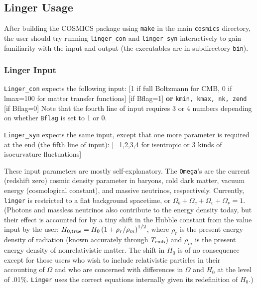 \subsection{Linger Usage}
\label{linger:usage}

After building the COSMICS package using {\tt make} in the main {\tt cosmics}
directory, the user should try running {\tt linger\_con} and {\tt linger\_syn}
interactively to gain familiarity with the input and output (the executables
are in subdirectory {\tt bin}).

\subsubsection{Linger Input}

{\tt Linger\_con} expects the following input:\hfil\newline
\indent{}\hfil\newline
\indent{}\hfil\newline
\indent{} [1 if full Boltzmann for CMB, 0 if lmax=100 for
    matter transfer functions]\hfil\newline
\indent{} [if Bflag=1] {\bf or}
               {\tt kmin, kmax, nk, zend} [if Bflag=0]\hfil\newline
Note that the fourth line of input requires 3 or 4 numbers depending on
whether {\tt Bflag} is set to 1 or 0.

{\tt Linger\_syn} expects the same input, except that one more parameter
is required at the end (the fifth line of input):\hfil\newline
\indent{} [=1,2,3,4 for isentropic or 3 kinds of isocurvature
fluctuations]\hfil\newline

These input parameters are mostly self-explanatory.  The {\tt Omega}'s are
the current (redshift zero) cosmic density parameter in baryons, cold
dark matter, vacuum energy (cosmological constant), and massive neutrinos,
respectively.  Currently, {\tt linger} is restricted to a flat background
spacetime, or $\Omega_b+\Omega_c+\Omega_v+\Omega_\nu=1$.  (Photons and
massless neutrinos also contribute to the energy density today, but their
effect is accounted for by a tiny shift in the Hubble constant from the
value input by the user: $H_{\rm 0,true}=H_0\left(1+\rho_r/\rho_m\right)^
{1/2}$, where $\rho_r$ is the present energy density of radiation (known
accurately through $T_{\rm cmb}$) and $\rho_m$ is the present energy density
of nonrelativistic matter.  The shift in $H_0$ is of no consequence except
for those users who wish to include relativistic particles in their
accounting of $\Omega$ and who are concerned with differences in $\Omega$
and $H_0$ at the level of .01\%.  {\tt Linger} uses the correct equations
internally given its redefinition of $H_0$.)

